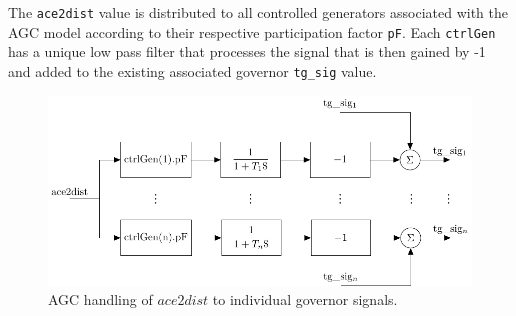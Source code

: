 The \verb|ace2dist| value is distributed to all controlled generators associated with the AGC model according to their respective participation factor \verb|pF|.
Each \verb|ctrlGen| has a unique low pass filter that processes the signal that is then gained by -1 and added to the existing associated governor \verb|tg_sig| value.

\begin{figure}[!h]
	\centering
	\footnotesize
	\includegraphics[width=\linewidth]{sections/agc/200722-AGCblockdiagram-p3}
	\caption{AGC handling of $ace2dist$ to individual governor signals.}
	\label{fig: agc block diagram 3}
\end{figure}%
